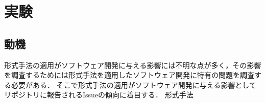 \documentclass[main]{subfiles}
\begin{document}
\chapter{実験}

\section{動機}

形式手法の適用がソフトウェア開発に与える影響には不明な点が多く，その影響を調査するためには形式手法を適用したソフトウェア開発に特有の問題を調査する必要がある．
そこで形式手法の適用がソフトウェア開発に与える影響としてリポジトリに報告されるIssueの傾向に着目する．
形式手法
\end{document}
